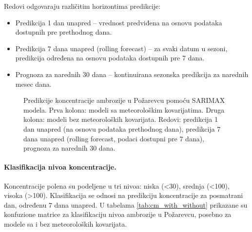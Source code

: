 \documentclass[12pt]{article}
\begin{document}
Redovi odgovaraju različitim horizontima predikcije:  
\begin{itemize}
    \item Predikcija 1 dan unapred – vrednost predviđena na osnovu podataka dostupnih pre prethodnog dana.
    \item Predikcija 7 dana unapred (rolling forecast) – za svaki datum u sezoni, predikcija određena na osnovu podataka dostupnih pre 7 dana.
    \item Prognoza za narednih 30 dana – kontinuirana sezonska predikcija za narednih mesec dana.
\end{itemize}


\begin{figure}[H]
    \centering



    \caption{Predikcije koncentracije ambrozije u Požarevcu pomoću SARIMAX modela.  
    Prva kolona: modeli sa meteorološkim kovarijatima. Druga kolona: modeli bez meteoroloških kovarijata.  
    Redovi: predikcija 1 dan unapred (na osnovu podataka prethodnog dana), predikcija 7 dana unapred (rolling forecast, podaci dostupni pre 7 dana), prognoza za narednih 30 dana.}
    \label{fig:sarimax_forecast_3x2}
\end{figure}

\paragraph{\textbf{Klasifikacija nivoa koncentracije.}}  
Koncentracije polena su podeljene u tri nivoa: niska (<30), srednja (<100), visoka (>100).  
Klasifikacija se odnosi na predikciju koncentracije za posmatrani dan, određenu 7 dana unapred.  
U tabelama \ref{tab:cm_with_without} prikazane su konfuzione matrice za klasifikaciju nivoa ambrozije u Požarevcu, posebno za modele sa i bez meteoroloških kovarijata.
\end{document}
